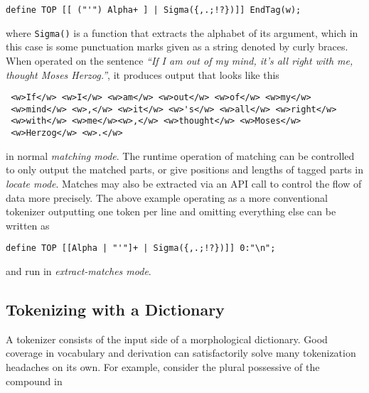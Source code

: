 \documentclass{llncs}
\begin{document}
\begin{center}
  \begin{framed}
\begin{verbatim}
define TOP [[ ("'") Alpha+ ] | Sigma({,.;!?})]] EndTag(w);
\end{verbatim}
  \end{framed}
\end{center}

\noindent where \verb+Sigma()+ is a function that extracts the alphabet of its argument, which in this case is
some punctuation marks given as a string denoted by curly braces.
When operated on the sentence
\emph{``If I am out of my mind, it's all right with me, thought Moses Herzog.''},
it produces output that looks like this

\begin{verbatim}
 <w>If</w> <w>I</w> <w>am</w> <w>out</w> <w>of</w> <w>my</w>
 <w>mind</w> <w>,</w> <w>it</w> <w>'s</w> <w>all</w> <w>right</w> 
 <w>with</w> <w>me</w><w>,</w> <w>thought</w> <w>Moses</w>
 <w>Herzog</w> <w>.</w>
\end{verbatim}

\noindent in normal \emph{matching mode}. The runtime operation of matching can be
controlled to only output the matched parts, or give positions and
lengths of tagged parts in \emph{locate mode}. Matches may also be extracted
via an API call to control the flow of data more precisely. The above example
operating as a more conventional tokenizer outputting one token per line and
omitting everything else can be written as

\begin{center}
  \begin{framed}
\begin{verbatim}
define TOP [[Alpha | "'"]+ | Sigma({,.;!?})]] 0:"\n";
\end{verbatim}
  \end{framed}
\end{center}

\noindent and run in \emph{extract-matches mode}.

\subsection{Tokenizing with a Dictionary}

A tokenizer consists of the input side of a morphological dictionary.
Good coverage in vocabulary and derivation can satisfactorily solve
many tokenization headaches on its own. For example, consider the plural 
possessive of the compound in
\end{document}
